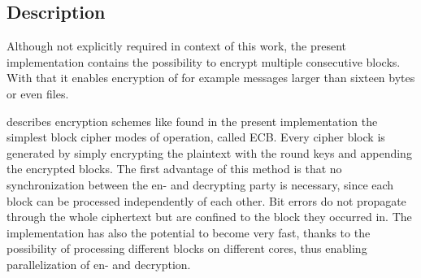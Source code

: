 \hypertarget{description-7}{%
\subsection{Description}\label{description-7}}

Although not explicitly required in context of this work, the present
implementation contains the possibility to encrypt multiple consecutive
blocks. With that it enables encryption of for example messages larger
than sixteen bytes or even files.

\cite[ch. 5.1.1]{paar} describes
encryption schemes like found in the present implementation the simplest
block cipher modes of operation, called \ac{ECB}.
Every cipher block is generated by simply encrypting the plaintext with
the round keys and appending the encrypted blocks. The first advantage
of this method is that no synchronization between the en- and decrypting
party is necessary, since each block can be processed independently of
each other. Bit errors do not propagate through the whole ciphertext but
are confined to the block they occurred in. The implementation has also
the potential to become very fast, thanks to the possibility of
processing different blocks on different cores, thus enabling
parallelization of en- and decryption.

